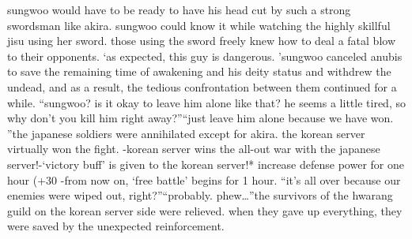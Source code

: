  sungwoo would have to be ready to have his head cut by such a strong swordsman like akira.
sungwoo could know it while watching the highly skillful jisu using her sword.
 those using the sword freely knew how to deal a fatal blow to their opponents.
‘as expected, this guy is dangerous.
’sungwoo canceled anubis to save the remaining time of awakening and his deity status and withdrew the undead, and as a result, the tedious confrontation between them continued for a while.
“sungwoo? is it okay to leave him alone like that? he seems a little tired, so why don’t you kill him right away?”“just leave him alone because we have won.
”the japanese soldiers were annihilated except for akira.
the korean server virtually won the fight.
-korean server wins the all-out war with the japanese server!-‘victory buff’ is given to the korean server!* increase defense power for one hour (+30%
-from now on, ‘free battle’ begins for 1 hour.
“it’s all over because our enemies were wiped out, right?”“probably.
 phew…”the survivors of the hwarang guild on the korean server side were relieved.
 when they gave up everything, they were saved by the unexpected reinforcement.

